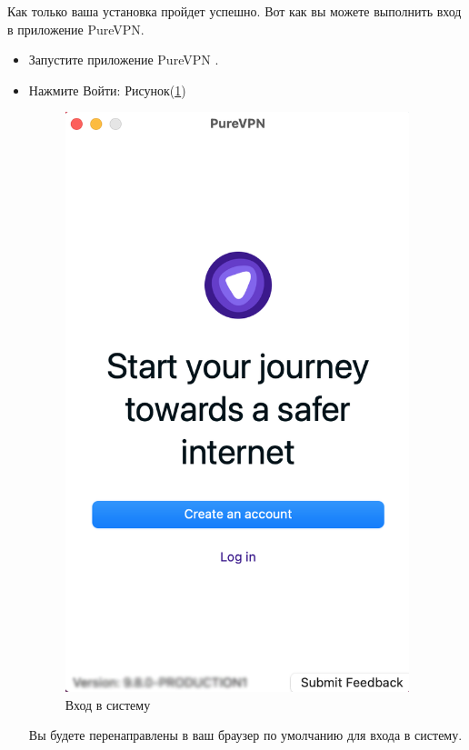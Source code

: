 Как только ваша установка пройдет успешно. Вот как вы можете выполнить вход в приложение PureVPN.
\begin{itemize}
\item Запустите приложение PureVPN .
\item Нажмите Войти:  Рисунок(\ref{fig:29})
\begin{figure}[H]
\includegraphics[width=10cm]{24.png}
\centering
\caption{Вход в систему}
\label{fig:29}
\end{figure}

Вы будете перенаправлены в ваш браузер по умолчанию для входа в систему.


\end{itemize}
